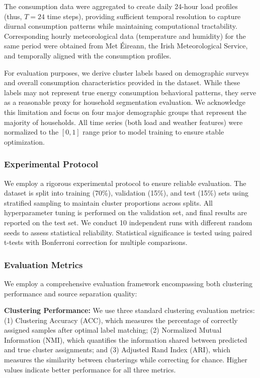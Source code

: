 \documentclass[journal]{IEEEtran}
\begin{document}
The consumption data were aggregated to create daily 24-hour load profiles (thus, $T=24$ time steps), providing sufficient temporal resolution to capture diurnal consumption patterns while maintaining computational tractability. Corresponding hourly meteorological data (temperature and humidity) for the same period were obtained from Met Éireann, the Irish Meteorological Service, and temporally aligned with the consumption profiles. 

For evaluation purposes, we derive cluster labels based on demographic surveys and overall consumption characteristics provided in the dataset. While these labels may not represent true energy consumption behavioral patterns, they serve as a reasonable proxy for household segmentation evaluation. We acknowledge this limitation and focus on four major demographic groups that represent the majority of households. All time series (both load and weather features) were normalized to the $[0, 1]$ range prior to model training to ensure stable optimization.

\subsubsection{Experimental Protocol}
We employ a rigorous experimental protocol to ensure reliable evaluation. The dataset is split into training (70\%), validation (15\%), and test (15\%) sets using stratified sampling to maintain cluster proportions across splits. All hyperparameter tuning is performed on the validation set, and final results are reported on the test set. We conduct 10 independent runs with different random seeds to assess statistical reliability. Statistical significance is tested using paired t-tests with Bonferroni correction for multiple comparisons.

\subsubsection{Evaluation Metrics}
We employ a comprehensive evaluation framework encompassing both clustering performance and source separation quality:

\textbf{Clustering Performance:} We use three standard clustering evaluation metrics: (1) Clustering Accuracy (ACC), which measures the percentage of correctly assigned samples after optimal label matching; (2) Normalized Mutual Information (NMI), which quantifies the information shared between predicted and true cluster assignments; and (3) Adjusted Rand Index (ARI), which measures the similarity between clusterings while correcting for chance. Higher values indicate better performance for all three metrics.
\end{document}

